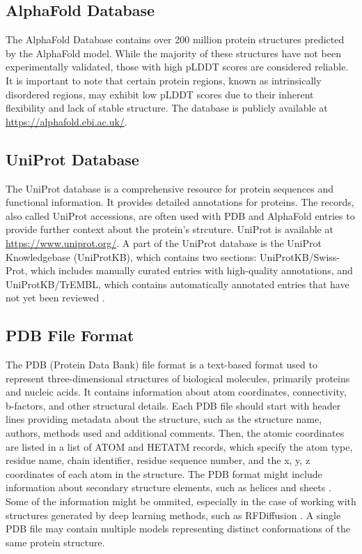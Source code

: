 \subsection{AlphaFold Database}
\label{sec:alphafold-db}

The AlphaFold Database \cite{varadi2024alphafold} contains over 200 million protein structures predicted by the AlphaFold model. While the majority of these structures have not been experimentally validated, those with high pLDDT scores are considered reliable. It is important to note that certain protein regions, known as intrinsically disordered regions, may exhibit low pLDDT scores due to their inherent flexibility and lack of stable structure. The database is publicly available at \url{https://alphafold.ebi.ac.uk/}.

\subsection{UniProt Database}
\label{sec:uniprot-db}

The UniProt database \cite{uniprot2025uniprot} is a comprehensive resource for protein sequences and functional information. It provides detailed annotations for proteins. The records, also called UniProt accessions, are often used with PDB and AlphaFold entries to provide further context about the protein's strcuture. UniProt is available at \url{https://www.uniprot.org/}. A part of the UniProt database is the UniProt Knowledgebase (UniProtKB), which contains two sections: UniProtKB/Swiss-Prot, which includes manually curated entries with high-quality annotations, and UniProtKB/TrEMBL, which contains automatically annotated entries that have not yet been reviewed \cite{boutet2016uniprotkb}.

\subsection{PDB File Format}
\label{sec:pdb-format}

The PDB (Protein Data Bank) file format is a text-based format used to represent three-dimensional structures of biological molecules, primarily proteins and nucleic acids. It contains information about atom coordinates, connectivity, b-factors, and other structural details. Each PDB file should start with header lines providing metadata about the structure, such as the structure name, authors, methods used and additional comments. Then, the atomic coordinates are listed in a list of ATOM and HETATM records, which specify the atom type, residue name, chain identifier, residue sequence number, and the x, y, z coordinates of each atom in the structure. The PDB format might include information about secondary structure elements, such as helices and sheets \cite{westbrook2003pdb}. Some of the information might be ommited, especially in the case of working with structures generated by deep learning methods, such as RFDiffusion \cite{watson2023novo}. A single PDB file may contain multiple models representing distinct conformations of the same protein structure.

